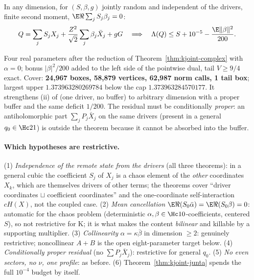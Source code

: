 \begin{theorem}\label{thm:kjoint-B}
In any dimension, for $(S,\beta,g)$ jointly random and independent of the drivers, finite second moment, $\E\Re\sum_jS_j\beta_j=0$:
\[
Q=\sum_jS_jX_j+\frac{Z^2}{\sqrt2}\sum_j\beta_j\bar X_j+gG\quad\Longrightarrow\quad\Lambda(Q)\le S+10^{-5}-\frac{\E\|\beta\|^2}{200}.
\]
\end{theorem}
Four real parameters after the reduction of Theorem~\ref{thm:kjoint-complex} with $\alpha=0$; bonus $|\beta|^2/200$ added to the left side of the pointwise dual, tail $V\ge9/4$
exact. Cover: \textbf{24,967 boxes, 58,879 vertices, 62,987 norm calls, 1 tail box}; largest upper $1.373963280269784$ below the cap $1.373963284570177$. It strengthens (ii) of
 (one driver, no buffer) to arbitrary dimension with a proper buffer and the same deficit $1/200$. The residual must be conditionally \emph{proper}: an
antiholomorphic part $\sum_jP_j\bar X_j$ on the same drivers (present in a general $q_0\in\Hc21$) is outside the theorem because it cannot be absorbed into the buffer.

\paragraph{Which hypotheses are restrictive.} (1) \emph{Independence of the remote state from the drivers} (all three theorems): in a general cubic the coefficient $S_j$ of
$X_j$ is a chaos element of the \emph{other} coordinates $X_k$, which are themselves drivers of other terms; the theorems cover ``driver coordinates $\sqcup$ coefficient
coordinates'' and the one-coordinate self-interaction $cH(X)$, not the coupled case. (2) \emph{Mean cancellation} $\E\Re(S_0\bar\alpha)=\E\Re(S_0\beta)=0$: automatic for
the chaos problem (deterministic $\alpha,\beta\in\Hc10$-coefficients, centered $S$), so not restrictive for K; it is what makes the content \emph{bilinear} and killable by a
supporting multiplier. (3) \emph{Collinearity} $\alpha=\kappa\bar\beta$ in dimension $\ge2$: genuinely restrictive; noncollinear $A{+}B$ is the open eight-parameter target below.
(4) \emph{Conditionally proper residual} (no $\sum P_j\bar X_j$): restrictive for general $q_0$. (5) \emph{No even sectors, no $\nu$, one profile}: as before.
(6) Theorem~\ref{thm:kjoint-junta} spends the full $10^{-4}$ budget by itself.


